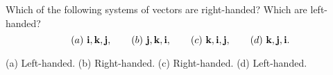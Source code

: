 \begin{ex}
  Which of the following systems of vectors are right-handed? Which
  are left-handed?
  \begin{equation*}
    (a)~\vect{i},\vect{k},\vect{j}, \qquad
    (b)~\vect{j},\vect{k},\vect{i}, \qquad
    (c)~\vect{k},\vect{i},\vect{j}, \qquad
    (d)~\vect{k},\vect{j},\vect{i}.
  \end{equation*}
  \begin{sol}
    (a) Left-handed.
    (b) Right-handed.
    (c) Right-handed.
    (d) Left-handed.
  \end{sol}
\end{ex}
